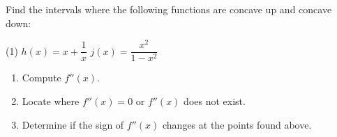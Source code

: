 \documentclass[../mathNotesPreamble]{subfiles}
\begin{document}
  \begin{ex*}
    Find the intervals where the following functions are concave up and concave down:
  \end{ex*}
  \pagebreak

  \begin{extasks}[after-item-skip=\stretch{1}](1)
    \task $h(x)=x+\dfrac{1}{x}$
    \task $j(x)=\dfrac{x^2}{1-x^2}$
  \end{extasks}
  \pagebreak

  \begin{thmBox*}
    \begin{enumerate}
      \item Compute $f''(x)$.
      \item Locate where $f''(x)=0$ or $f''(x)$ does not exist.
      \item Determine if the sign of $f''(x)$ changes at the points found above.
    \end{enumerate}
  \end{thmBox*}
\end{document}
